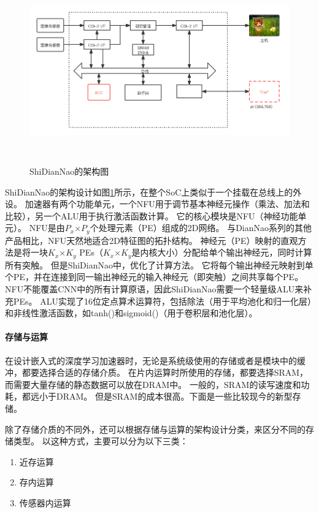 \begin{figure}[htbp]
    \centering
    \includegraphics[width=15cm,height=8cm]{figures/ShiDianNao_arch.png}
    \caption{ShiDianNao的架构图}
    \label{fig:shidiannao_arch}
\end{figure}
ShiDianNao的架构设计如图\ref{fig:shidiannao_arch}所示\cite{2015ShiDianNao}，在整个SoC上类似于一个挂载在总线上的外设。
加速器有两个功能单元，一个NFU用于调节基本神经元操作（乘法、加法和比较），另一个ALU用于执行激活函数计算。
它的核心模块是NFU（神经功能单元）。
NFU是由$P_x$×$P_y$个处理元素（PE）组成的2D网络。
与DianNao系列的其他产品相比，NFU天然地适合2D特征图的拓扑结构。  
神经元（PE）映射的直观方法是将一块$K_x$×$K_y$ PEs（$K_x$×$K_y$是内核大小）分配给单个输出神经元，同时计算所有突触。
但是ShiDianNao中，优化了计算方法。
它将每个输出神经元映射到单个PE，并在连接到同一输出神经元的输入神经元（即突触）之间共享每个PE。  
NFU不能覆盖CNN中的所有计算原语，因此ShiDianNao需要一个轻量级ALU来补充PEs。
ALU实现了16位定点算术运算符，包括除法（用于平均池化和归一化层）和非线性激活函数，如tanh()和sigmoid()（用于卷积层和池化层）。


\paragraph{存储与运算}
在设计嵌入式的深度学习加速器时，无论是系统级使用的存储或者是模块中的缓冲，都要选择合适的存储介质。
在片内运算时所使用的存储，都要选择SRAM，而需要大量存储的静态数据可以放在DRAM中。
一般的，SRAM的读写速度和功耗，都远小于DRAM。
但是SRAM的成本很高。下面是一些比较现今的新型存储。  

除了存储介质的不同外，还可以根据存储与运算的架构设计分类，来区分不同的存储类型。
以这种方式，主要可以分为以下三类：
\begin{enumerate}
    \item 近存运算
    \item 存内运算
    \item 传感器内运算
\end{enumerate}   


